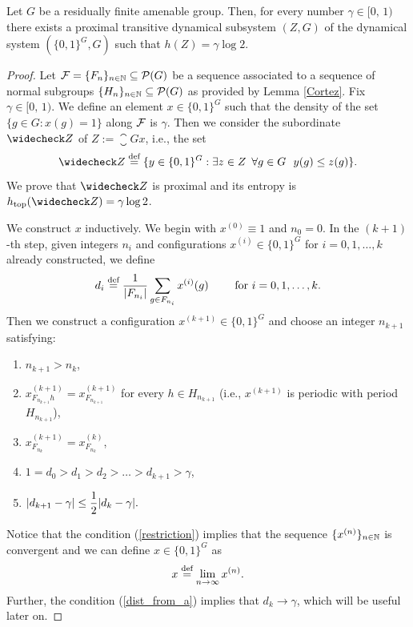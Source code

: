 \begin{thm}\label{thm:KriegerProximal}
Let $G$ be a residually finite amenable group. Then, for every number $\gamma\in [0,\, 1)$ there exists a proximal transitive dynamical subsystem $(Z, G)$ of the dynamical system $(\{0,1\}^G,G)$ such that $h(Z) = \gamma\log 2.$
\end{thm}

\begin{proof}
Let $\mathcal{F}=\{F_n\}_{n\in\mathbb{N}}\subseteq\operatorname{\mathcal{P}}(G)$ be a \Folner sequence  associated to a sequence of normal  subgroups $\{H_n\}_{n\in\mathbb{N}}\subseteq\operatorname{\mathcal{P}}(G)$ as provided by Lemma \ref{Cortez}.
Fix $\gamma\in [0,\, 1)$.
We define an element $x\in\{0,1\}^G$ such that the density of the set $\{g\in G: x(g)=1\}$ along $\operatorname{\mathcal{F}}$  is $\gamma$. 
%
Then we consider the subordinate $\subord{Z}$ of $Z:=\closure{Gx}$, i.e., the set
\[
\subord{Z} \defeq \{y\in\{0,1\}^G:\exists z\in Z \,\,\,\forall g\in G \,\,\,\, y(g)\leq z(g) \}.
\]
We prove that $\subord{Z}$ is proximal and its entropy is $\htop(\subord{Z})=\gamma\log 2$.


We construct $x$ inductively. We begin with $x^{(0)}\equiv 1$ and $n_0=0$. 
In the $(k+1)$-th step, given integers $n_{i}$ and configurations $x^{(i)}\in\{0,1\}^G$ for $i=0,1,\ldots,k$ already constructed, we define 
\[
d_i \stackrel{\textup{def}}{=} \frac{1}{|F_{n_i}|}\sum_{g\in F_{n_i}}x^{(i)}(g)~~~~~~\mbox{ for $i=0,1,\ldots,k$}.
\] 
Then we construct a configuration $x^{(k+1)}\in\{0,1\}^G$ and choose an integer $n_{k+1}$ satisfying:
\begin{enumerate}[(1)]
\item  $n_{k+1}>n_{k}$,
\item  $x^{({k+1})}_{F_{n_{k+1}}h}= x^{({k+1})}_{F_{n_{k+1}}}$ for every $h\in H_{n_{k+1}}$ (i.e., $x^{({k+1})}$ is periodic with period $H_{n_{k+1}}$),
\item\label{restriction} $x^{({k+1})}_{F_{n_{k}}}=x^{(k)}_{F_{n_{k}}}$,
\item\label{d_k_decrease} $1=d_0> d_1> d_2>\ldots >d_{k+1} >\gamma$, 
\item\label{dist_from_a} $\begin{displaystyle}|d_{k+1}-\gamma|\leq \frac{1}{2}|d_{k}-\gamma|.\end{displaystyle}$
\end{enumerate}
\noindent 
Notice that the condition (\ref{restriction}) implies that the sequence $\{x^{(n)}\}_{n\in \mathbb{N}}$ is convergent and we can define $x\in \{0,1\}^G$ as
 \[
 x\stackrel{\textup{def}}{=}\lim_{n\to\infty}x^{(n)}.
 \]
Further, the condition (\ref{dist_from_a}) implies that $d_k\to \gamma$, which will be useful later on.


\end{proof}
